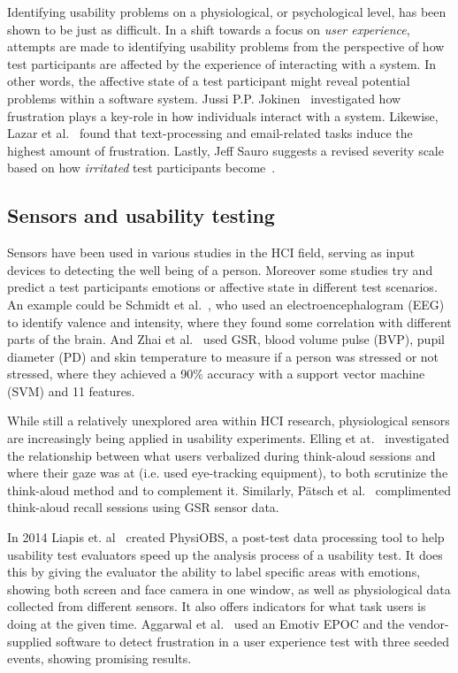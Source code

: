 Identifying usability problems on a physiological, or psychological level, has been shown to be just as difficult. In a
shift towards a focus on \textit{user experience}, attempts are made to identifying usability problems
from the perspective of how test participants are affected by the experience of interacting with a system. In other
words, the affective state of a test participant might reveal potential problems within a software system. Jussi
P.P. Jokinen~\cite{workplace_up_study} investigated how frustration plays a key-role in how individuals interact with a
system. Likewise, Lazar et al.~\cite{frustration_with_computers} found that text-processing and email-related tasks
induce the highest amount of frustration. Lastly, Jeff Sauro suggests a revised severity scale based on how
\textit{irritated} test participants become~\cite{jeff_severity}.

\subsection{Sensors and usability testing}
Sensors have been used in various studies in the HCI field, serving as input devices to detecting the well being of a person.
Moreover some studies try and predict a test participants emotions or affective state in different test scenarios. 
An example could be Schmidt et al.~\cite{schmidt_trainor}, who used an electroencephalogram (EEG) to identify valence and intensity, where they found some correlation with different parts of the brain.
And Zhai et al.~\cite{gsr_data_processing2} used GSR, blood volume pulse (BVP), pupil diameter (PD) and skin temperature to measure if a person was stressed or not stressed, where they achieved a 90\% accuracy with a support vector machine (SVM) and 11 features.

While still a relatively unexplored area within HCI research,
physiological sensors are increasingly being applied in usability experiments.
Elling et at.~\cite{concurrent_think_aloud_eye_tracking} investigated the
relationship between what users verbalized during think-aloud sessions and where
their gaze was at (i.e. used eye-tracking equipment), to both scrutinize the
think-aloud method and to complement it. Similarly, P\"{a}tsch et
al.~\cite{using_sensor_graphs_think_aloud} complimented think-aloud recall
sessions using GSR sensor data.

In 2014 Liapis et. al~\cite{fusion4} created PhysiOBS, a post-test data processing tool to help usability test evaluators speed up the analysis process of a usability test. It does this by giving the evaluator the ability to label specific areas with emotions, showing both screen and face camera in one window, as well as physiological data collected from different sensors. It also offers indicators for what task users is doing at the given time.
Aggarwal et al.~\cite{sensor_example} used an Emotiv EPOC and the vendor-supplied software to detect frustration in a
user experience test with three seeded events, showing promising results.

